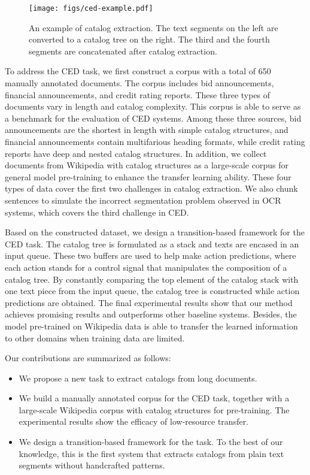 \documentclass[runningheads]{llncs}
\begin{document}
\begin{figure}[t]
    \centering
    \texttt{[image: figs/ced-example.pdf]}
    \caption{An example of catalog extraction. The text segments on the left are converted to a catalog tree on the right. The third and the fourth segments are concatenated after catalog extraction.}
    \label{fig:ced_example}
\end{figure}

To address the CED task, we first construct a corpus with a total of 650 manually annotated documents.
The corpus includes bid announcements, financial announcements, and credit rating reports.
These three types of documents vary in length and catalog complexity.
This corpus is able to serve as a benchmark for the evaluation of CED systems.
Among these three sources, bid announcements are the shortest in length with simple catalog structures, and financial announcements contain multifarious heading formats, while credit rating reports have deep and nested catalog structures.
In addition, we collect documents from Wikipedia with catalog structures as a large-scale corpus for general model pre-training to enhance the transfer learning ability.
These four types of data cover the first two challenges in catalog extraction.
We also chunk sentences to simulate the incorrect segmentation problem observed in OCR systems, which covers the third challenge in CED.

Based on the constructed dataset, we design a transition-based framework for the CED task.
The catalog tree is formulated as a stack and texts are encased in an input queue.
These two buffers are used to help make action predictions, where each action stands for a control signal that manipulates the composition of a catalog tree.
By constantly comparing the top element of the catalog stack with one text piece from the input queue, the catalog tree is constructed while action predictions are obtained.
The final experimental results show that our method achieves promising results and outperforms other baseline systems.
Besides, the model pre-trained on Wikipedia data is able to transfer the learned information to other domains when training data are limited.

Our contributions are summarized as follows:
\begin{itemize}
    \item We propose a new task to extract catalogs from long documents.
    \item We build a manually annotated corpus for the CED task, together with a large-scale Wikipedia corpus with catalog structures for pre-training. The experimental results show the efficacy of low-resource transfer.
    \item We design a transition-based framework for the task. To the best of our knowledge, this is the first system that extracts catalogs from plain text segments without handcrafted patterns.
\end{itemize}
\end{document}
